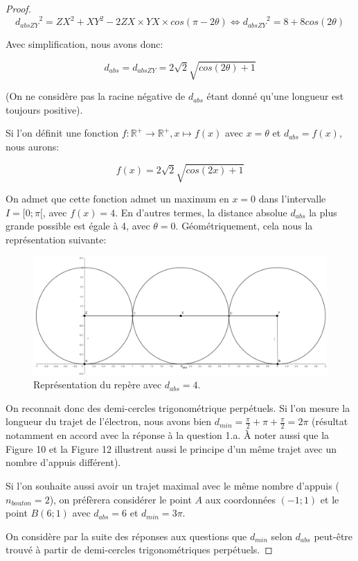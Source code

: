 \documentclass{amsart}
\theoremstyle{definition}
\theoremstyle{remark}
\numberwithin{equation}{section}
\begin{document}
\begin{proof}
  \[{d_{abs ZY}}^2=ZX^2+XY^2-2ZX\times YX\times cos(\pi-2\theta) \Leftrightarrow {d_{abs ZY}}^2=8+8cos(2\theta)\]

  Avec simplification, nous avons donc:

  \[d_{abs}={d_{abs ZY}}=2\sqrt{2}\sqrt{cos(2\theta)+1}\]

  (On ne considère pas la racine négative de $d_{abs}$ étant donné qu'une longueur est toujours positive).

  Si l'on définit une fonction $f:\mathbb{R^+}\longrightarrow \mathbb{R^+}, x\longmapsto f(x)$ avec $x=\theta$ et $d_{abs}=f(x)$, nous aurons:

  \[f(x)=2\sqrt{2}\sqrt{cos(2x)+1}\]

  On admet que cette fonction admet un maximum en $x=0$ dans l'intervalle $I=[0;\pi[$, avec $f(x)=4$. En d'autres termes, la distance absolue $d_{abs}$ la plus grande possible est égale à 4, avec $\theta=0$. Géométriquement, cela nous la représentation suivante:

  \begin{figure}[H]
    \centering
    \includegraphics[scale=0.18]{images/perfect_run.png}
    \caption{Représentation du repère avec $d_{abs}=4$.}
  \end{figure}

  On reconnait donc des demi-cercles trigonométrique perpétuels. Si l'on mesure la longueur du trajet de l'électron, nous avons bien $d_{min}=\frac{\pi}{2}+\pi+\frac{\pi}{2}=2\pi$ (résultat notamment en accord avec la réponse à la question 1.a. À noter aussi que la Figure 10 et la Figure 12 illustrent aussi le principe d'un même trajet avec un nombre d'appuis différent).

  Si l'on souhaite aussi avoir un trajet maximal avec le même nombre d'appuis ($n_{bouton}=2$), on préfèrera considérer le point $A$ aux coordonnées $(-1;1)$ et le point $B(6;1)$ avec $d_{abs}=6$ et $d_{min}=3\pi$.

  On considère par la suite des réponses aux questions que $d_{min}$ selon $d_{abs}$ peut-être trouvé à partir de demi-cercles trigonométriques perpétuels.

\end{proof}
\end{document}
